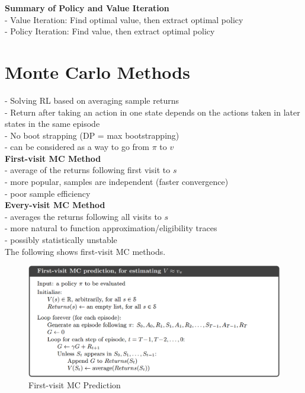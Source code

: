 \documentclass{article}
\begin{document}
\noindent
\textbf{Summary of Policy and Value Iteration}\\
- Value Iteration: Find optimal value, then extract optimal policy\\
- Policy Iteration: Find value, then extract optimal policy\\

\newpage
\noindent
\section{Monte Carlo Methods}
- Solving RL based on averaging sample returns\\
- Return after taking an action in one state depends on the actions taken in
later states in the same episode\\
- No boot strapping (DP = max bootstrapping)\\
- can be considered as a way to go from $\pi$ to $v$\\

\noindent
\textbf{First-visit MC Method}\\
- average of the returns following first visit to $s$\\
- more popular, samples are independent (faster convergence)\\
- poor sample efficiency\\

\noindent
\textbf{Every-visit MC Method}\\
- averages the returns following all visits to $s$\\
- more natural to function approximation/eligibility traces\\
- possibly statistically unstable\\

\noindent
The following shows first-visit MC methods.

\begin{figure}[h]
\includegraphics[scale=0.28]{firstvisit_mc}
\centering
\caption{First-visit MC Prediction}
\end{figure}
\end{document}
